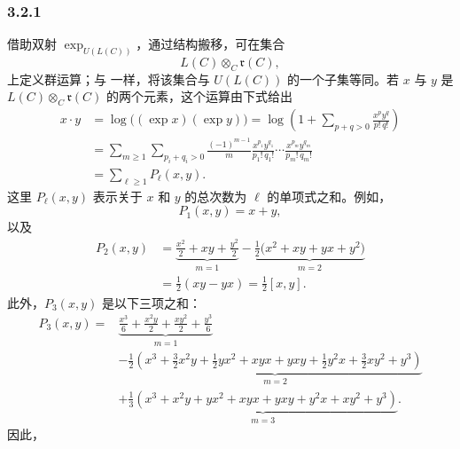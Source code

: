 
\subsubsection*{3.2.1}
\label{sga3:VIIB:3.2.1}
借助双射 \(\exp_{U(L(C))}\)，通过结构搬移，可在集合
\[
  L(C)\otimes_C\mathfrak r(C),
\]
上定义群运算；与  一样，将该集合与 \(U(L(C))\) 的一个子集等同。若 \(x\) 与 \(y\) 是 \(L(C)\otimes_C\mathfrak r(C)\) 的两个元素，这个运算由下式给出
\label{sga3:VIIB:3.2.1:transported-product}
\[
\begin{aligned}
  x\mathbin{\cdot}y
  &=
  \log\bigl((\exp x)(\exp y)\bigr)
  =
  \log\left(
    1+\sum_{p+q>0}\frac{x^p y^q}{p!\,q!}
  \right)
  \\
  &=
  \sum_{m\geq1}
  \sum_{p_i+q_i>0}
  \frac{(-1)^{m-1}}{m}
  \frac{x^{p_1}y^{q_1}}{p_1!\,q_1!}
  \cdots
  \frac{x^{p_m}y^{q_m}}{p_m!\,q_m!}
  \\
  &=
  \sum_{\ell\geq1}P_\ell(x,y).
\end{aligned}
\]
这里 \(P_\ell(x,y)\) 表示关于 \(x\) 和 \(y\) 的总次数为 \(\ell\) 的单项式之和。例如，
\[
  P_1(x,y)=x+y,
\]
以及
\[
\begin{aligned}
  P_2(x,y)
  &=
  \underbrace{
    \frac{x^2}{2}+xy+\frac{y^2}{2}
  }_{m=1}
  -
  \underbrace{
    \frac12\bigl(x^2+xy+yx+y^2\bigr)
  }_{m=2}
  \\
  &=
  \frac12(xy-yx)
  =
  \frac12[x,y].
\end{aligned}
\]
此外，\(P_3(x,y)\) 是以下三项之和：
\[
\begin{aligned}
  P_3(x,y)
  ={}&
  \underbrace{
    \frac{x^3}{6}
    +\frac{x^2y}{2}
    +\frac{xy^2}{2}
    +\frac{y^3}{6}
  }_{m=1}
  \\
  &-
  \underbrace{
    \frac12\left(
      x^3+\frac32x^2y+\frac12yx^2+xyx+yxy
      +\frac12y^2x+\frac32xy^2+y^3
    \right)
  }_{m=2}
  \\
  &+
  \underbrace{
    \frac13\left(
      x^3+x^2y+yx^2+xyx+yxy+y^2x+xy^2+y^3
    \right)
  }_{m=3}.
\end{aligned}
\]
因此，
\label{sga3:VIIB:3.2.1:P3}

